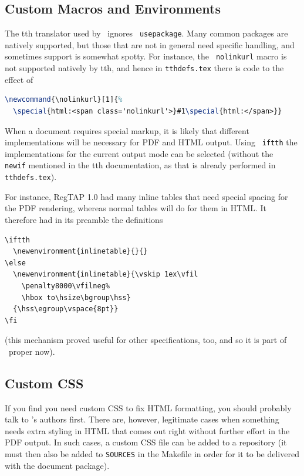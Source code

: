 \documentclass[11pt,a4paper]{ivoa}
\newcommand{\texword}[1]{\texttt{\color{texcolor} #1}}
\begin{document}
\subsection{Custom Macros and Environments}

The tth translator used by \ivoatex\ ignores \texword{usepackage}.  Many
common packages are natively supported, but those that are not in
general need specific handling, and sometimes support is somewhat spotty.  
For instance, the \texword{nolinkurl}
macro is not supported natively by tth, and hence in
\texttt{tthdefs.tex} there is code to the effect of
\begin{lstlisting}[language=TeX,basicstyle=\footnotesize]
\newcommand{\nolinkurl}[1]{%
  \special{html:<span class='nolinkurl'>}#1\special{html:</span>}}
\end{lstlisting}

When a document requires special markup, it is likely that 
different implementations will be necessary for PDF and HTML output.
Using \texword{iftth} the implementations for the current output mode
can be selected (without the \texword{newif} mentioned in the tth
documentation, as that is already performed in \texttt{tthdefs.tex}).

For instance, RegTAP 1.0 had many inline tables that need special spacing
for the PDF rendering, whereas normal tables will do for them
in HTML.  It therefore
had in its preamble the definitions
\begin{lstlisting}
\iftth
  \newenvironment{inlinetable}{}{}
\else
  \newenvironment{inlinetable}{\vskip 1ex\vfil
    \penalty8000\vfilneg%
    \hbox to\hsize\bgroup\hss}
  {\hss\egroup\vspace{8pt}}
\fi
\end{lstlisting}

(this mechanism proved useful for other specifications, too, and so
it is part of \ivoatex~proper now).

\subsection{Custom CSS}
\label{sect:customcss}

If you find you need custom CSS to fix HTML formatting, you should
probably talk to \ivoatex's authors first.  There are, however, 
legitimate cases when something needs extra styling in HTML that 
comes out right without further effort
in the PDF output.  In such cases, a custom CSS file can
be added to a repository (it must then also be added to \texttt{SOURCES}
in the Makefile in order for it to be delivered with the document
package).
\end{document}
